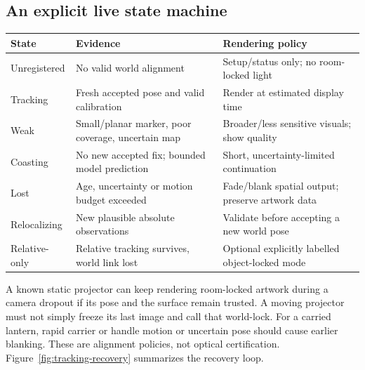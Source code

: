 \documentclass[11pt,a4paper]{article}
\begin{document}
\subsection{An explicit live state machine}
\begin{tabularx}{\linewidth}{@{}L{26mm}XX@{}}
\toprule
State & Evidence & Rendering policy\\ \midrule
Unregistered & No valid world alignment & Setup/status only; no room-locked light\\
Tracking & Fresh accepted pose and valid calibration & Render at estimated display time\\
Weak & Small/planar marker, poor coverage, uncertain map & Broader/less sensitive visuals; show quality\\
Coasting & No new accepted fix; bounded model prediction & Short, uncertainty-limited continuation\\
Lost & Age, uncertainty or motion budget exceeded & Fade/blank spatial output; preserve artwork data\\
Relocalizing & New plausible absolute observations & Validate before accepting a new world pose\\
Relative-only & Relative tracking survives, world link lost & Optional explicitly labelled object-locked mode\\
\bottomrule
\end{tabularx}

A known static projector can keep rendering room-locked artwork during a
camera dropout if its pose and the surface remain trusted.
A moving projector must not simply freeze its last image and call that
world-lock. For a carried lantern, rapid carrier or handle motion or
uncertain pose should cause earlier blanking. These are alignment policies, not optical certification.
Figure~\ref{fig:tracking-recovery} summarizes the recovery loop.
\end{document}
